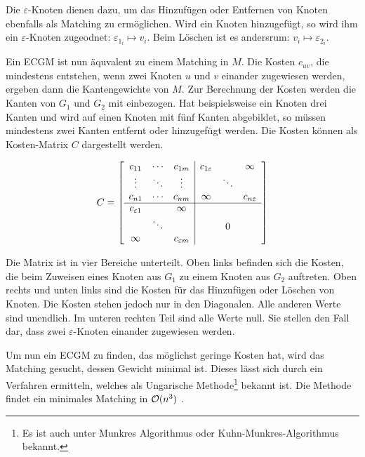 Die $\varepsilon$-Knoten dienen dazu, um das Hinzufügen oder Entfernen von Knoten 
ebenfalls als Matching zu ermöglichen. Wird ein Knoten hinzugefügt, so wird ihm ein 
$\varepsilon$-Knoten zugeodnet: $\varepsilon_{1_i} \mapsto v_i$. Beim Löschen 
ist es andersrum: $v_i \mapsto \varepsilon_{2_i}$.

 Ein ECGM ist nun äquvalent zu einem Matching in $M$. 
Die Kosten $c_{u v}$, die mindestens entstehen, wenn zwei Knoten $u$ und $v$ einander 
zugewiesen werden, ergeben dann die Kantengewichte von $M$. Zur Berechnung der Kosten 
werden die Kanten von $G_1$ und $G_2$ 
mit einbezogen. Hat beispielsweise ein Knoten drei Kanten und wird auf einen Knoten mit 
fünf Kanten abgebildet, so müssen mindestens zwei Kanten entfernt oder hinzugefügt werden. 
Die Kosten können als Kosten-Matrix $C$ dargestellt werden. 

\[
C=\left [
\begin{array}{ccc|ccc}
c_{11} & \cdots & c_{1 m} & c_{1\varepsilon} &        & \infty \\
\vdots & \ddots & \vdots &                  & \ddots & \\
c_{n 1} & \cdots & c_{n m} & \infty           &        & c_{n\varepsilon} \\

\cline{1-6}

c_{\varepsilon 1} &        & \infty            & &   & \\
                  & \ddots &                   & & 0 & \\
\infty            &        & c_{\varepsilon m} & &   &

\end{array} \right ]
\]

Die Matrix ist in vier Bereiche unterteilt. Oben links befinden sich die Kosten, 
die beim Zuweisen eines Knoten aus $G_1$ zu einem Knoten aus $G_2$ auftreten. Oben 
rechts und unten links sind die Kosten für das Hinzufügen oder Löschen von Knoten. 
Die Kosten stehen jedoch nur in den Diagonalen. Alle anderen Werte sind unendlich. 
Im unteren rechten Teil sind alle Werte null. Sie stellen den Fall dar, dass zwei 
$\varepsilon$-Knoten einander zugewiesen werden.

Um nun ein ECGM zu finden, das möglichst geringe Kosten hat, wird das Matching gesucht, 
dessen Gewicht minimal ist. Dieses lässt sich durch ein Verfahren ermitteln, welches als 
Ungarische Methode\footnote{Es ist auch unter Munkres Algorithmus oder 
Kuhn-Munkres-Algorithmus bekannt.} bekannt ist. Die Methode findet ein minimales Matching 
in $\mathcal{O}(n^3)$ \cite{Munkres1957}. 

